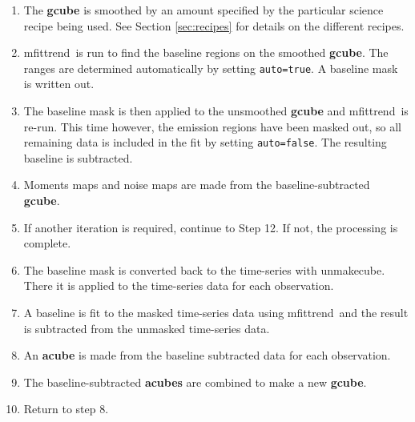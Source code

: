 \documentclass[twoside,11pt]{article}
\newcommand{\xref}[3]{#1}
\renewcommand{\_}{\texttt{\symbol{95}}}
\newcommand{\task}[1]{\textsf{#1}}
\newcommand{\param}[1]{\texttt{#1}}
\newcommand{\unmakecube}{\xref{\task{unmakecube}}{sun258}{UNMAKECUBE}}
\newcommand{\mfittrend}{\xref{\task{mfittrend}}{sun95}{MFITTREND}}
\begin{document}
\begin{enumerate}[label=(\textbf{\arabic*})]
\item  The \textbf{g\_cube} is smoothed by an amount specified by the particular science recipe being used. See Section \ref{sec:recipes} for details on the different recipes.

\item   \mfittrend\ is run to find the baseline regions on the smoothed \textbf{g\_cube}. The ranges are determined automatically by setting \param{auto=true}. A baseline mask is written out.

\item  The baseline mask is then applied to the unsmoothed \textbf{g\_cube} and \mfittrend\ is re-run. This time however, the emission regions have been masked out, so all remaining data is included in the fit by setting \param{auto=false}. The resulting baseline is subtracted.

\item  Moments maps and noise maps are made from the baseline-subtracted \textbf{g\_cube}.

\item If another iteration is required, continue to Step 12. If not, the processing is complete.

\item  The baseline mask is converted back to the time-series with \unmakecube. There it is applied to the time-series data for each observation.

\item   A baseline is fit to the masked time-series data using \mfittrend\ and the result is subtracted from the unmasked time-series data.

\item   An \textbf{a\_cube} is made from the baseline subtracted data for each observation.

\item   The baseline-subtracted \textbf{a\_cubes} are combined to make a new \textbf{g\_cube}.

\item  Return to step 8.
\end{enumerate}
\end{document}
